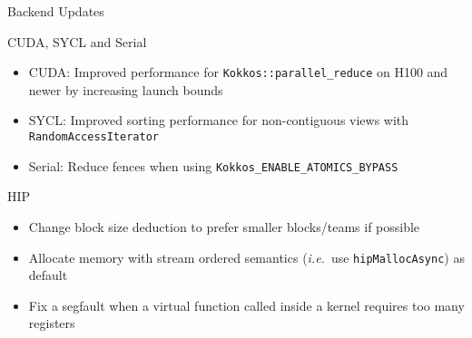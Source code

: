 
\begin{frame}[fragile]

  {\Huge Backend Updates}

  \vspace{10pt}

\end{frame}





\begin{frame}[fragile]{CUDA, SYCL and Serial}
  \begin{itemize}
      \item CUDA: Improved performance for \texttt{Kokkos::parallel\_reduce} on H100 and newer by increasing launch bounds
      \item SYCL: Improved sorting performance for non-contiguous views with \texttt{RandomAccessIterator}
      \item Serial: Reduce fences when using \texttt{Kokkos\_ENABLE\_ATOMICS\_BYPASS}
  \end{itemize}
\end{frame}

\begin{frame}[fragile]{HIP}
  \begin{itemize}
      \item Change block size deduction to prefer smaller blocks/teams if possible
      \item Allocate memory with stream ordered semantics (\emph{i.e.}\ use \texttt{hipMallocAsync}) as default
      \item Fix a segfault when a virtual function called inside a kernel requires too many registers
  \end{itemize}
\end{frame}




